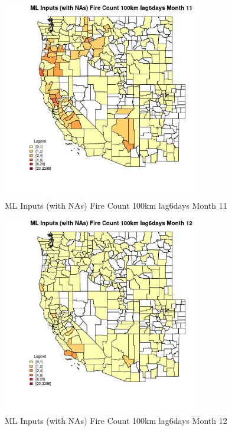 \begin{figure} 
\centering  
\includegraphics[width=0.77\textwidth]{Code_Outputs/Report_ML_input_PM25_Step4_part_e_de_duplicated_aves_compiled_2019-05-20wNAs_CountyFire_Count_100km_lag6daysmedianMonth11.jpg} 
\caption{\label{fig:Report_ML_input_PM25_Step4_part_e_de_duplicated_aves_compiled_2019-05-20wNAsCountyFire_Count_100km_lag6daysmedianMonth11}ML Inputs (with NAs) Fire Count 100km lag6days Month 11} 
\end{figure} 
 

\begin{figure} 
\centering  
\includegraphics[width=0.77\textwidth]{Code_Outputs/Report_ML_input_PM25_Step4_part_e_de_duplicated_aves_compiled_2019-05-20wNAs_CountyFire_Count_100km_lag6daysmedianMonth12.jpg} 
\caption{\label{fig:Report_ML_input_PM25_Step4_part_e_de_duplicated_aves_compiled_2019-05-20wNAsCountyFire_Count_100km_lag6daysmedianMonth12}ML Inputs (with NAs) Fire Count 100km lag6days Month 12} 
\end{figure} 
 

